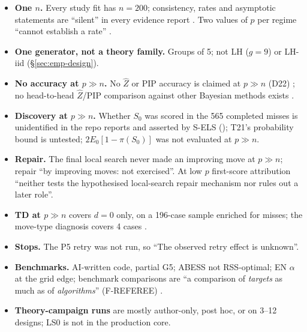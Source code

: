 \begin{notproved}
\begin{itemize}
\item \textbf{One $n$.} Every study fit has $n=200$; consistency, rates and asymptotic statements are ``silent'' in every evidence report
 .
Two values of $p$ per regime ``cannot establish a rate'' .
\item \textbf{One generator, not a theory family.} Groups of 5; not LH ($g=9$) or LH-iid (\S\ref{sec:emp-design}).
\item \textbf{No accuracy at $p\gg n$.} No $\hat Z$ or PIP accuracy is claimed at $p\gg n$ (D22)
; no head-to-head $\hat Z$/PIP comparison against other Bayesian methods
exists .
\item \textbf{Discovery at $p\gg n$.} Whether $S_0$ was scored in the 565 completed misses is unidentified in the repo reports and asserted by S-ELS
(); T21's probability bound is untested; $2E_0[1-\pi(S_0)]$ was not evaluated at $p\gg n$.
\item \textbf{Repair.} The final local search never made an improving move at $p\gg n$; repair ``by improving moves: not exercised''.
At low $p$ first-score attribution ``neither tests the hypothesised local-search repair mechanism nor rules out a later role''.
\item \textbf{TD at $p\gg n$} covers $d=0$ only, on a 196-case sample enriched for misses; the move-type diagnosis covers 4 cases
.
\item \textbf{Stops.} The P5 retry was not run, so ``The observed retry effect is unknown''.
\item \textbf{Benchmarks.} AI-written code, partial G5; ABESS not RSS-optimal; EN $\alpha$ at the grid edge; benchmark comparisons are ``a
comparison of \emph{targets} as much as of \emph{algorithms}'' (F-REFEREE) .
\item \textbf{Theory-campaign runs} are mostly author-only, post hoc, or on 3--12 designs; LS0 is not in the production core.
\end{itemize}
\end{notproved}

